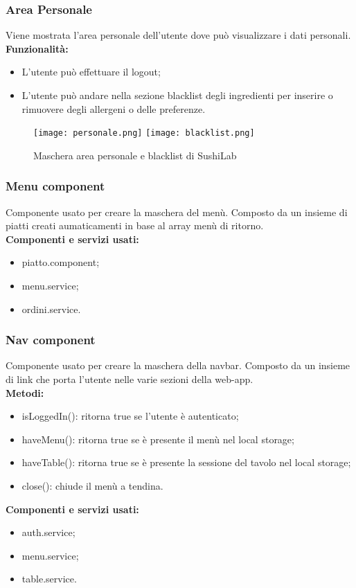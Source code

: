 \subsubsection{Area Personale}
Viene mostrata l'area personale dell'utente dove può visualizzare i dati personali.
\textbf{Funzionalità:}
\begin{itemize}
    \item L'utente può effettuare il logout;
    \item L'utente può andare nella sezione blacklist degli ingredienti per inserire o rimuovere degli allergeni o delle preferenze.
\end{itemize}
\begin{figure}[H]
    \centering
    \texttt{[image: personale.png]}
    \texttt{[image: blacklist.png]}
    \caption{Maschera area personale e blacklist di SushiLab}
\end{figure}
\label{cap:menu.component}

\subsubsection{Menu component}
Componente usato per creare la maschera del menù. Composto da un insieme di piatti creati aumaticamenti in base al array menù di ritorno.\\
\textbf{Componenti e servizi usati:}
\begin{itemize}
    \item piatto.component;
    \item menu.service;
    \item ordini.service.
\end{itemize}

\subsubsection{Nav component}
Componente usato per creare la maschera della navbar. Composto da un insieme di link che porta l'utente nelle varie sezioni della web-app.\\
\textbf{Metodi:}
\begin{itemize}
    \item isLoggedIn(): ritorna true se l'utente è autenticato;
    \item haveMenu(): ritorna true se è presente il menù nel local storage;
    \item haveTable(): ritorna true se è presente la sessione del tavolo nel local storage;
    \item close(): chiude il menù a tendina.
\end{itemize}
\textbf{Componenti e servizi usati:}
\begin{itemize}    
    \item auth.service;
    \item menu.service;
    \item table.service.
\end{itemize}

